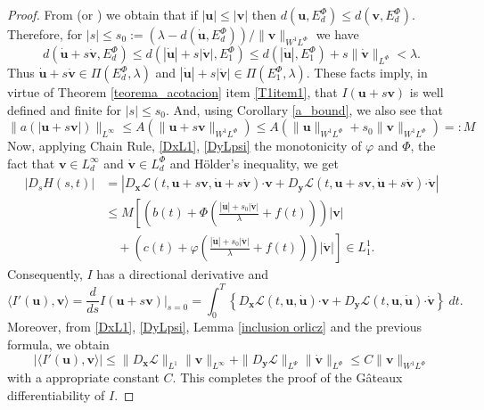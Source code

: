 \documentclass[twoside]{elsarticle}
\theoremstyle{remark}
\newcommand{\orlnor}{\|_{L^{\Phi}}}
\newcommand{\linf}{\|_{L^{\infty}}}
\newcommand{\lphi}{L^{\Phi}}
\newcommand{\lpsi}{L^{\Psi}}
\newcommand{\ephi}{E^{\Phi}}
\newcommand{\sobnor}{\|_{W^{1}\lphi}}
\renewcommand{\b}[1]{\boldsymbol{#1}}
\newcommand{\ccdot}{\b{\cdot}}
\renewcommand{\leq}{\leqslant}
\begin{document}
\begin{proof}
From \cite[Lemma 10.1]{KR} (or \cite[Thm. 5.5]{Orliczvectorial2005} ) we obtain that if $|\b{u}|\leq |\b{v}|$ then    $d(\b{u},\ephi_d)\leq d(\b{v},\ephi_d)$. 
Therefore, for  $|s|\leq s_0:=\left(\lambda-d(\b{\dot{u}},\ephi_d)\right)/\|\b{v}\sobnor$ we have
\[
d \left(\b{\dot{u}}+s\b{\dot{v}}, \ephi_d \right)
\leq
d \left(|\b{\dot{u}}|+s|\b{\dot{v}}|, \ephi_1 \right)
\leq d \left(|\b{\dot{u}}|,\ephi_1 \right)+ s \|\b{\dot{v}}\orlnor < \lambda.
\]
Thus $\b{\dot{u}}+s\b{\dot{v}} \in \Pi(\ephi_d,\lambda)$ and  $|\b{\dot{u}}|+s|\b{\dot{v}}| \in \Pi(\ephi_1,\lambda)$. These facts imply, in virtue of Theorem \ref{teorema_acotacion} item \ref{T1item1}, that $I(\b{u}+s\b{v})$ is well defined and finite for $|s|\leq s_0$. 
And, using  Corollary \ref{a_bound}, we also see that
\[ \|a(|\b{u}+s\b{v}|)\|_{L^{\infty}}\leq  A(\|\b{u}+s\b{v}\sobnor)\leq
 A(\|\b{u}\sobnor+s_0\|\b{v}\sobnor)=:M
\]
Now, applying Chain Rule, \eqref{DxL1}, \eqref{DyLpsi} the monotonicity of $\varphi$ and $\Phi$, 
the fact that $\b{v}\in L^{\infty}_d$ and $\b{\dot{v}}\in\lphi_d$ and H\"older's inequality, we get
\begin{equation}\label{ctg}
\begin{split}
|D_s H(s,t)|&=\left| D_{\b{x}}\mathcal{L}(t,\b{u}+s\b{v},\b{\dot{u}}+s\b{\dot{v}})\ccdot \b{v} +  D_{\b{y}}\mathcal{L}(t,\b{u}+s\b{v},\b{\dot{u}}+s\b{\dot{v}})\ccdot\b{\dot{v}}\right| \\
 & \leq M \left[\left( b(t)+ \Phi\left(\frac{|\b{\dot{u}}|+s_0|\b{\dot{v}}|}{\lambda}+f(t)\right)\right)|\b{v}|\right.\\
&\left. \quad+ \left(c(t)+ \varphi\left (\frac{|\b{\dot{u}}|+s_0|\b{\dot{v}}|}{\lambda}+f(t)\right)\right)|\b{\dot{v}}| \right]\in L^1_1.
\end{split}
\end{equation}
Consequently, $I$ has a directional derivative and
\[
\langle I'(\b{u}),\b{v} \rangle=\frac{d}{ds}I(\b{u}+s\b{v})\big|_{s=0}=\int_0^T  
\left\{D_{\b{x}}\mathcal{L}(t,\b{u},\b{\dot{u}})\ccdot \b{v}+ D_{\b{y}}\mathcal{L}(t,\b{u},\b{\dot{u}})\ccdot\b{\dot{v}}\right\} \ dt.
\]
Moreover, from \eqref{DxL1}, \eqref{DyLpsi}, Lemma \ref{inclusion orlicz} and the previous formula, we obtain
\[
|\langle I'(\b{u}),\b{v} \rangle| \leq \|D_{\b{x}}\mathcal{L}\|_{L^1} \| \b{v}\linf + 
\|D_{\b{y}}\mathcal{L}\|_{\lpsi} \|\b{\dot{v}}\orlnor \leq C \|\b{v}\sobnor
\]
with a appropriate constant $C$.
This completes the proof of the G\^ateaux differentiability of $I$. 


\end{proof}
\end{document}
